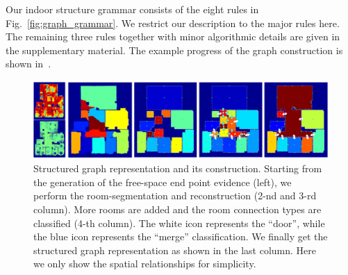 Our indoor structure grammar consists of the eight rules
in Fig.~\ref{fig:graph_grammar}.
We restrict our description to the major rules here. The
remaining three rules together with minor algorithmic details are given
in the supplementary material. The example progress of the graph
construction is shown in~.
\begin{figure}[tb]
\begin{center}
\includegraphics[width=160mm]{../figures/graph2.pdf}
\end{center}
\caption{Structured graph representation and its construction. Starting
from the generation of the free-space end point evidence (left), we
perform the room-segmentation and reconstruction (2-nd and 3-rd column).
More rooms are added and the room connection types are classified (4-th
column). The white icon represents the ``door'', while the blue icon
 represents the ``merge'' classification.
 We finally get the structured graph representation as
shown in the last column. Here we only show the spatial relationships
for simplicity. }
   \label{fig:graph}
 \vspace{-0.325cm}
\end{figure}



